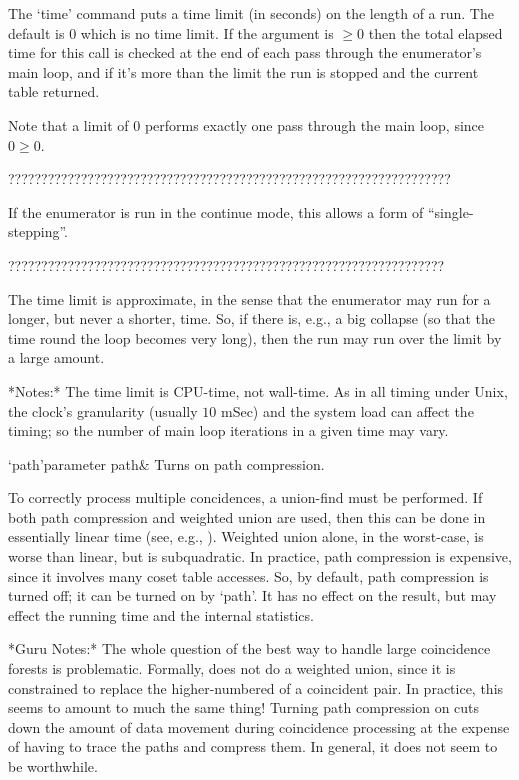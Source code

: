 The `time' command  puts a time limit (in seconds) on  the length of a
run.  The  default is 0  which is no  time limit.  If the  argument is
$\ge0$ then the total elapsed time for this call is checked at the end
of each pass through the enumerator's main loop, and if it's more than
the limit the run is stopped and the current table returned.

Note that a limit of $0$ performs exactly one pass through the main
loop, since $0 \ge 0$.

???????????????????????????????????????????????????????????????????

If the enumerator is run in the continue mode, this allows a form of
  ``single-stepping''\kern-1.5pt.

??????????????????????????????????????????????????????????????????

The time  limit is approximate, in  the sense that  the enumerator may
run for a longer, but never a shorter, time.  So, if there is, e.g., a
big collapse (so that the time round the loop becomes very long), then
the run may run over the limit by a large amount.

*Notes:*
The time  limit is  CPU-time, not wall-time.   As in all  timing under
Unix, the clock's granularity (usually  $10$ mSec) and the system load
can affect  the timing;  so the  number of main  loop iterations  in a
given time may vary.


\>`path'{parameter path}&
Turns on path compression.

To  correctly  process  multiple  concidences, a  union-find  must  be
performed.  If both path compression and weighted union are used, then
this can be  done in essentially linear time  (see, e.g., \cite{CLR}).
Weighted union alone, in the  worst-case, is worse than linear, but is
subquadratic.  In  practice, path  compression is expensive,  since it
involves many coset table  accesses.  So, by default, path compression
is turned off; it can be turned on by `path'.  It has no effect on the
result, but may effect the running time and the internal statistics.

*Guru Notes:*
The whole question of the best way to handle large coincidence forests
is problematic.  Formally, {\ACE} does  not do a weighted union, since
it is constrained to replace the higher-numbered of a coincident pair.
In practice,  this seems  to amount to  much the same  thing!  Turning
path  compression on  cuts down  the  amount of  data movement  during
coincidence processing at the expense of having to trace the paths and
compress them.  In general, it does not seem to be worthwhile.

